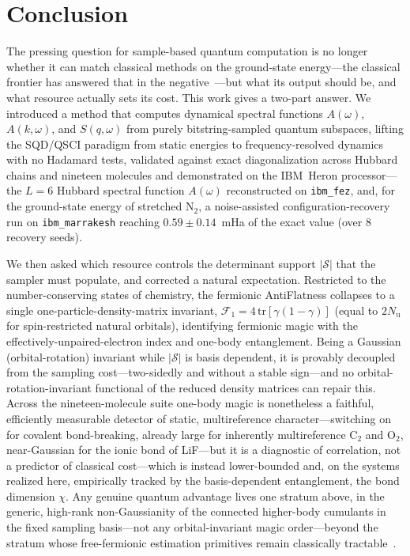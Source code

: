 \section{Conclusion}

The pressing question for sample-based quantum computation is no longer whether it can match classical
methods on the ground-state energy---the classical frontier has answered that in the
negative~\cite{leechan2023,belagali2026,reinholdt2025}---but what its output should be, and what
resource actually sets its cost. This work gives a two-part answer. We introduced a method that
computes dynamical spectral functions $A(\omega)$, $A(k,\omega)$, and $S(q,\omega)$ from purely
bitstring-sampled quantum subspaces, lifting the SQD/QSCI paradigm from static energies to
frequency-resolved dynamics with no Hadamard tests, validated against exact diagonalization across
Hubbard chains and nineteen molecules and demonstrated on the IBM~Heron processor---the $L=6$ Hubbard
spectral function $A(\omega)$ reconstructed on \texttt{ibm\_fez}, and, for the ground-state energy of
stretched $\mathrm{N_2}$, a noise-assisted configuration-recovery run on \texttt{ibm\_marrakesh}
reaching $0.59\pm0.14$~mHa of the exact value (over $8$ recovery seeds).

We then asked which resource controls the determinant support $|\mathcal S|$ that the sampler must
populate, and corrected a natural expectation. Restricted to the number-conserving states of
chemistry, the fermionic AntiFlatness collapses to a single one-particle-density-matrix invariant,
$\mathcal F_1=4\,\mathrm{tr}[\gamma(1-\gamma)]$ (equal to $2N_{\mathrm u}$ for spin-restricted natural
orbitals), identifying fermionic magic with the effectively-unpaired-electron index and one-body entanglement. Being a Gaussian (orbital-rotation)
invariant while $|\mathcal S|$ is basis dependent, it is provably decoupled from the sampling
cost---two-sidedly and without a stable sign---and no orbital-rotation-invariant functional of the
reduced density matrices can repair this. Across the nineteen-molecule suite one-body magic is nonetheless a faithful,
efficiently measurable detector of static, multireference character---switching on for covalent
bond-breaking, already large for inherently multireference $\mathrm{C_2}$ and $\mathrm{O_2}$,
near-Gaussian for the ionic bond of LiF---but it is a diagnostic of correlation, not a predictor of
classical cost---which is instead lower-bounded and, on the systems realized here, empirically tracked by the basis-dependent entanglement, the bond dimension $\chi$.
Any genuine quantum advantage lives one stratum above, in the generic, high-rank non-Gaussianity of the
connected higher-body cumulants in the fixed sampling basis---not any orbital-invariant magic order---beyond
the stratum whose free-fermionic estimation primitives remain classically tractable~\cite{oh2026}.

